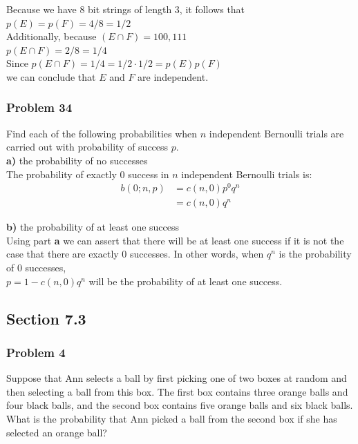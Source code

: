 \documentclass[fontsize=11pt]{scrartcl} %
\begin{document}
Because we have 8 bit strings of length 3, it follows that\\
$p(E) = p(F) = 4/8 = 1/2$\\

Additionally, because $(E \cap F) = {100,111}$\\
$p(E \cap F) = 2/8 = 1/4$\\

Since $p(E \cap F) = 1/4 = 1/2 \cdot 1/2 = p(E)p(F)$\\
we can conclude that $E$ and $F$ are independent.

\subsubsection*{Problem 34}
Find each of the following probabilities when $n$ independent Bernoulli trials are carried out with probability of success $p$.\\

\textbf{a)} the probability of no successes\\
The probability of exactly 0 success in $n$ independent Bernoulli trials is:
\begin{align*}
	b(0;n,p) &= c(n,0)p^0q^n\\
	         &= c(n,0)q^n
\end{align*}

\textbf{b)} the probability of at least one success\\
Using part \textbf{a} we can assert that there will be at least one success if it is not the case that there are exactly 0 successes. In other words, when $q^n$ is the probability of 0 successes,\\ $p=1-c(n,0)q^n$ will be the probability of at least one success.\\

\subsection*{Section 7.3}
\subsubsection*{Problem 4}
Suppose that Ann selects a ball by first picking one of two boxes at random and then selecting a ball from this box. The first box contains three orange balls and four black balls, and the second box contains five orange balls and
six black balls. What is the probability that Ann picked a ball from the second box if she has selected an orange ball?\\
\end{document}
